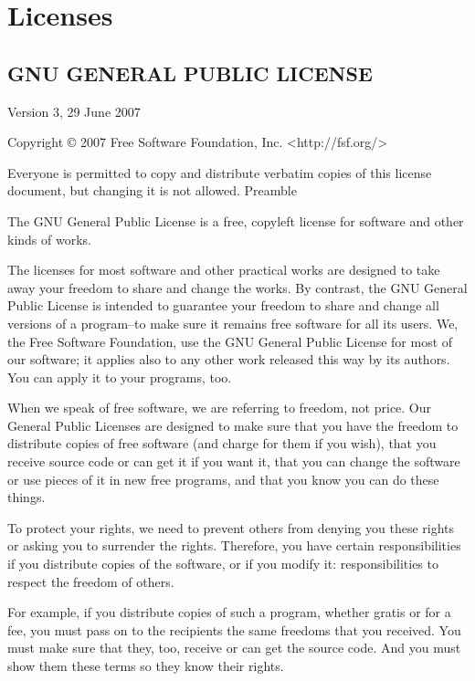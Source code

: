 \pagebreak

\printindex

\pagebreak
\chapter{Licenses}
\label{Licenses}
{\tiny
\section {GNU GENERAL PUBLIC LICENSE}
\begin{multicols}{4}

Version 3, 29 June 2007

Copyright © 2007 Free Software Foundation, Inc. <http://fsf.org/>

Everyone is permitted to copy and distribute verbatim copies of this license document, but changing it is not allowed.
Preamble

The GNU General Public License is a free, copyleft license for software and other kinds of works.

The licenses for most software and other practical works are designed to take away your freedom to share and change the works. By contrast, the GNU General Public License is intended to guarantee your freedom to share and change all versions of a program--to make sure it remains free software for all its users. We, the Free Software Foundation, use the GNU General Public License for most of our software; it applies also to any other work released this way by its authors. You can apply it to your programs, too.

When we speak of free software, we are referring to freedom, not price. Our General Public Licenses are designed to make sure that you have the freedom to distribute copies of free software (and charge for them if you wish), that you receive source code or can get it if you want it, that you can change the software or use pieces of it in new free programs, and that you know you can do these things.

To protect your rights, we need to prevent others from denying you these rights or asking you to surrender the rights. Therefore, you have certain responsibilities if you distribute copies of the software, or if you modify it: responsibilities to respect the freedom of others.

For example, if you distribute copies of such a program, whether gratis or for a fee, you must pass on to the recipients the same freedoms that you received. You must make sure that they, too, receive or can get the source code. And you must show them these terms so they know their rights.


\end{multicols}}
